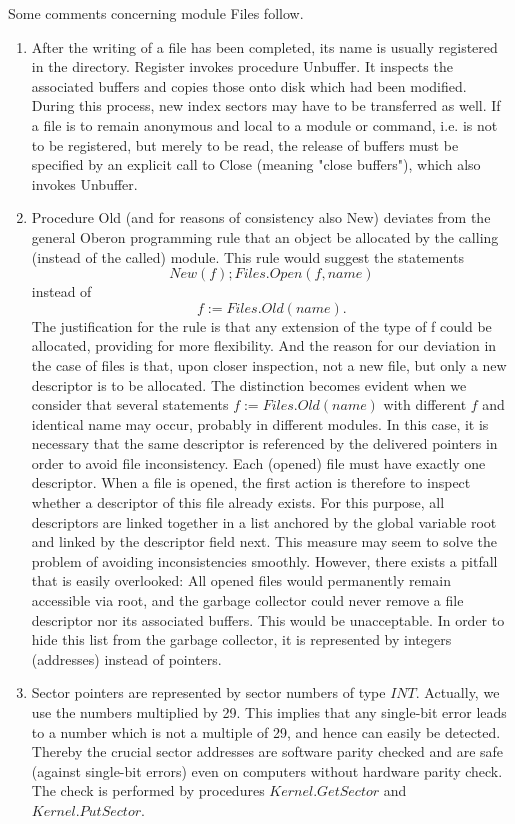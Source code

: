Some comments concerning module Files follow.
\begin{enumerate}
	\item After the writing of a file has been completed, its name is usually registered in the directory.
Register invokes procedure Unbuffer. It inspects the associated buffers and copies those onto
disk which had been modified. During this process, new index sectors may have to be transferred
as well. If a file is to remain anonymous and local to a module or command, i.e. is not to be
registered, but merely to be read, the release of buffers must be specified by an explicit call to
Close (meaning "close buffers"), which also invokes Unbuffer.
	\item Procedure Old (and for reasons of consistency also New) deviates from the general Oberon
programming rule that an object be allocated by the calling (instead of the called) module. This
rule would suggest the statements
\[ New(f); Files.Open(f, name) \] instead of \[ f := Files.Old(name). \] The justification for the rule is that any extension of the type of f
could be allocated, providing for more flexibility. And the reason for our deviation in the case of
files is that, upon closer inspection, not a new file, but only a new descriptor is to be allocated.
The distinction becomes evident when we consider that several statements
$f := Files.Old(name)$ with different $f$ and identical name may occur, probably in different modules. In this case, it is
necessary that the same descriptor is referenced by the delivered pointers in order to avoid file
inconsistency. Each (opened) file must have exactly one descriptor. When a file is opened, the
first action is therefore to inspect whether a descriptor of this file already exists. For this purpose,
all descriptors are linked together in a list anchored by the global variable root and linked by the
descriptor field next. This measure may seem to solve the problem of avoiding inconsistencies
smoothly. However, there exists a pitfall that is easily overlooked: All opened files would
permanently remain accessible via root, and the garbage collector could never remove a file
descriptor nor its associated buffers. This would be unacceptable. In order to hide this list from
the garbage collector, it is represented by integers (addresses) instead of pointers.
	\item Sector pointers are represented by sector numbers of type $INT$. Actually, we use the
numbers multiplied by 29. This implies that any single-bit error leads to a number which is not a
multiple of 29, and hence can easily be detected. Thereby the crucial sector addresses are
software parity checked and are safe (against single-bit errors) even on computers without
hardware parity check. The check is performed by procedures $Kernel.GetSector$ and $Kernel.PutSector$.
\end{enumerate}

